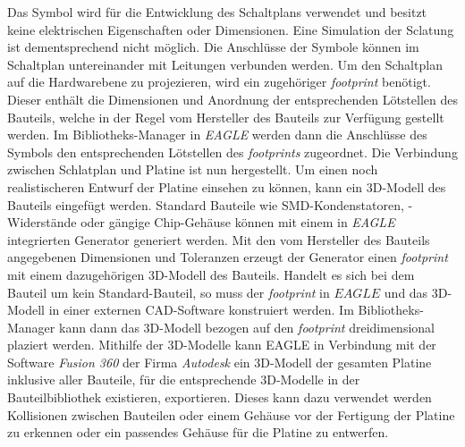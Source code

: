 Das Symbol wird für die Entwicklung des Schaltplans verwendet und besitzt keine elektrischen Eigenschaften oder Dimensionen. Eine Simulation der Sclatung ist dementsprechend nicht möglich. Die Anschlüsse der Symbole können im Schaltplan untereinander mit Leitungen verbunden werden. Um den Schaltplan auf die Hardwarebene zu projezieren, wird ein zugehöriger \textit{footprint} benötigt. Dieser enthält die Dimensionen und Anordnung der entsprechenden Lötstellen des Bauteils, welche in der Regel vom Hersteller des Bauteils zur Verfügung gestellt werden. Im Bibliotheks-Manager in \textit{EAGLE} werden dann die Anschlüsse des Symbols den entsprechenden Lötstellen des \textit{footprints} zugeordnet. Die Verbindung zwischen Schlatplan und Platine ist nun hergestellt. Um  einen noch realistischeren Entwurf der Platine einsehen zu können, kann ein 3D-Modell des Bauteils eingefügt werden. Standard Bauteile wie SMD-Kondenstatoren, -Widerstände oder gängige Chip-Gehäuse können mit einem in \textit{EAGLE} integrierten Generator generiert werden. Mit den vom Hersteller des Bauteils angegebenen Dimensionen und Toleranzen erzeugt der Generator einen \textit{footprint} mit einem dazugehörigen 3D-Modell des Bauteils. Handelt es sich bei dem Bauteil um kein Standard-Bauteil, so muss der \textit{footprint} in $EAGLE$ und das 3D-Modell in einer externen CAD-Software konstruiert werden. Im Bibliotheks-Manager kann dann das 3D-Modell bezogen auf den \textit{footprint} dreidimensional plaziert werden. Mithilfe der 3D-Modelle kann EAGLE in Verbindung mit der Software \textit{Fusion 360} der Firma \textit{Autodesk} ein 3D-Modell der gesamten Platine inklusive aller Bauteile, für die entsprechende 3D-Modelle in der Bauteilbibliothek existieren, exportieren. Dieses kann dazu verwendet werden Kollisionen zwischen Bauteilen oder einem Gehäuse vor der Fertigung der Platine zu erkennen oder ein passendes Gehäuse für die Platine zu entwerfen.

